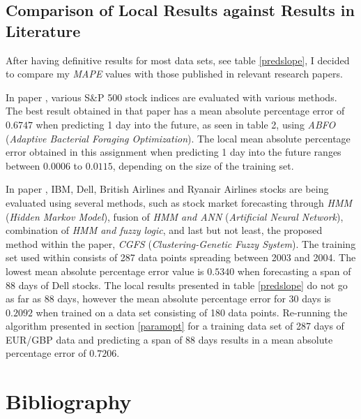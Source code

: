 \documentclass[a4paper,12pt]{article}
\begin{document}
\newpage
\subsection{Comparison of Local Results against Results in Literature}
	
	After having definitive results for most data sets, see table \ref{predslope}, I decided to compare my \textit{MAPE} values with those published in relevant research papers.
	
	In paper \cite{majhi2009efficient}, various S\&P 500 stock indices are evaluated with various methods. The best result obtained in that paper has a mean absolute percentage error of $0.6747$ when predicting 1 day into the future, as seen in table 2, using \textit{ABFO} (\textit{Adaptive Bacterial Foraging
	Optimization}). The local mean absolute percentage error obtained in this assignment when predicting 1 day into the future ranges between $0.0006$ to $0.0115$, depending on the size of the training set.
	
	In paper \cite{hadavandi2010integration}, IBM, Dell, British Airlines and Ryanair Airlines stocks are being evaluated using several methods, such as stock market forecasting through \textit{HMM}\cite{hassan2005stock} (\textit{Hidden Markov Model}), fusion of \textit{HMM and ANN}\cite{hassan2007fusion} (\textit{Artificial Neural Network}), combination of \textit{HMM and fuzzy logic}\cite{hassan2009combination}, and last but not least, the proposed method within the paper, \textit{CGFS} (\textit{Clustering-Genetic Fuzzy System}). The training set used within consists of 287 data points spreading between 2003 and 2004. The lowest mean absolute percentage error value is $0.5340$ when forecasting a span of 88 days of Dell stocks. The local results presented in table \ref{predslope} do not go as far as 88 days, however the mean absolute percentage error for 30 days is $0.2092$ when trained on a data set consisting of 180 data points. Re-running the algorithm presented in section \ref{paramopt} for a training data set of 287 days of EUR/GBP data and predicting a span of 88 days results in a mean absolute percentage error of $0.7206$.
	
\newpage
\section{Bibliography}

	\begingroup
	\renewcommand{\section}[2]{}
		 
		
	\endgroup
\end{document}
